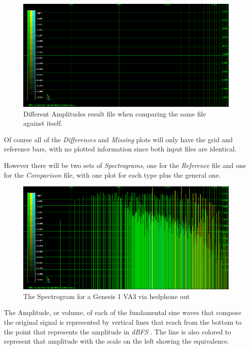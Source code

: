 \documentclass[10pt,a4paper]{report}
\begin{document}
\begin{figure}[H]
	\centering
	\includegraphics[width=1.0\linewidth]{plots/Plot1-SameFile.png}
	\caption[Same file compared]{Different Amplitudes result file when comparing the same file against itself.}
	\label{fig:plot1-samefile}
\end{figure}

Of course all of the \textit{Differences} and \textit{Missing} plots will only have the grid and reference bars, with no plotted information since both input files are identical. 

However there will be two sets of \textit{Spectrograms}, one for the \textit{Reference} file and one for the \textit{Comparison} file, with one plot for each type plus the general one.

\begin{figure}[H]
	\centering
	\includegraphics[width=1.0\linewidth]{plots/Plot2-SameFile-FM-Spectrogram.png}
	\caption[Spectrogram]{The Spectrogram for a Genesis 1 VA3 via hedphone out}
	\label{fig:plot2-samefile-fm-spectrogram}
\end{figure}

The Amplitude, or volume, of each of the fundamental sine waves that compose the original signal is represented by vertical lines that reach from the bottom to the point that represents the amplitude in \textit{dBFS} \cite{dbfs}. The line is also colored to represent that amplitude with the scale on the left showing the equivalence.
\end{document}

